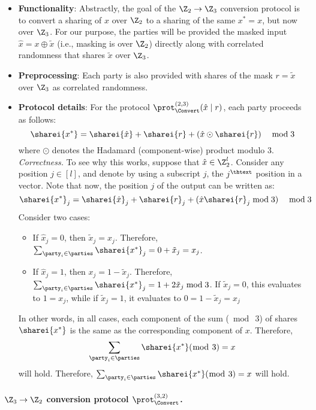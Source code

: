 \begin{itemize}
  \item \textbf{Functionality}: Abstractly, the goal of the $\Z_2 \to \Z_3$ conversion protocol is to convert a sharing of $x$ over $\Z_2$ to a sharing of the same $x^* = x$, but now over $\Z_3$. For our purpose, the parties will be provided the masked input $\hat{x} = x \oplus \tilde{x}$ (i.e., masking is over $\Z_2$) directly along with correlated randomness that shares $\tilde{x}$ over $\Z_3$.

  \item \textbf{Preprocessing}: Each party is also provided with shares of the mask $r = \tilde{x}$ over $\Z_3$ as correlated randomness.

  \item \textbf{Protocol details}: For the protocol $\prot_\Convert^{(2,3)}(\hat{x} \mid r)$, each party proceeds as follows:
  \[
  \sharei{x^*} = \sharei{\hat{x}} + \sharei{r} + (\hat{x} \odot \sharei{r}) \quad \bmod 3
  \]
where $\odot$ denotes the Hadamard (component-wise) product modulo 3.
\iffull
\noindent \textit{Correctness.} To see why this works, suppose that $\hat{x} \in \Z_2^l$. Consider any position $j \in [l]$, and denote by using a subscript $j$, the $j^\thtext$ position in a vector. Note that now, the position $j$ of the output can be written as:
\[
    \sharei{x^*}_j = \sharei{\hat{x}}_j + \sharei{r}_j + (\hat{x}\sharei{r}_j\bmod 3) \quad \bmod 3
\]
Consider two cases:
\begin{itemize}
\item If $\hat{x}_j = 0$, then $\tilde{x}_j = x_j$. Therefore, $\sum_{\party_i \in \parties} \sharei{x^*}_j = 0 + \tilde{x}_j = x_j$.

\item If $\hat{x}_j = 1$, then $x_j = 1 - \tilde{x}_j$. Therefore, $\sum_{\party_i \in \parties} \sharei{x^*}_j = 1 + 2\tilde{x}_j \bmod 3$. If $\tilde{x}_j = 0$, this evaluates to $1 = x_j$, while if $\tilde{x}_j = 1$, it evaluates to $0 = 1 - \tilde{x}_j = x_j$
\end{itemize}
In other words, in all cases, each component of the sum ($\bmod~3$) of shares $\sharei{x^*}$ is the same as the corresponding component of $x$.
Therefore,
\[
\sum_{\party_i \in \parties} \sharei{x^*} (\bmod~3) = x
\]
will hold.
Therefore, $\sum_{\party_i \in \parties} \sharei{x^*} (\bmod~3) = x$ will hold.
\fi
\end{itemize}


\paragraph{$\Z_3 \to \Z_2$ conversion protocol $\prot_\Convert^{(3,2)}$.}

